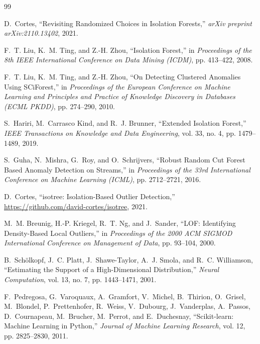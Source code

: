 
\begin{thebibliography}{99}

D.~Cortes,
``Revisiting Randomized Choices in Isolation Forests,''
\textit{arXiv preprint arXiv:2110.13402}, 2021.

F.~T. Liu, K.~M. Ting, and Z.-H. Zhou,
``Isolation Forest,''
in \textit{Proceedings of the 8th IEEE International Conference on Data Mining (ICDM)}, 
pp. 413--422, 2008.

F.~T. Liu, K.~M. Ting, and Z.-H. Zhou,
``On Detecting Clustered Anomalies Using SCiForest,''
in \textit{Proceedings of the European Conference on Machine Learning and Principles and Practice of Knowledge Discovery in Databases (ECML PKDD)},
pp. 274--290, 2010.

S.~Hariri, M.~Carrasco Kind, and R.~J. Brunner,
``Extended Isolation Forest,''
\textit{IEEE Transactions on Knowledge and Data Engineering}, 
vol. 33, no. 4, pp. 1479--1489, 2019.

S.~Guha, N.~Mishra, G.~Roy, and O.~Schrijvers,
``Robust Random Cut Forest Based Anomaly Detection on Streams,''
in \textit{Proceedings of the 33rd International Conference on Machine Learning (ICML)},
pp. 2712--2721, 2016.

D.~Cortes,
``isotree: Isolation-Based Outlier Detection,''
\url{https://github.com/david-cortes/isotree}, 2021.

M.~M. Breunig, H.-P. Kriegel, R.~T. Ng, and J.~Sander,
``LOF: Identifying Density-Based Local Outliers,''
in \textit{Proceedings of the 2000 ACM SIGMOD International Conference on Management of Data},
pp. 93--104, 2000.

B.~Sch{\"o}lkopf, J.~C. Platt, J.~Shawe-Taylor, A.~J. Smola, and R.~C. Williamson,
``Estimating the Support of a High-Dimensional Distribution,''
\textit{Neural Computation}, vol. 13, no. 7, pp. 1443--1471, 2001.

F.~Pedregosa, G.~Varoquaux, A.~Gramfort, V.~Michel, B.~Thirion, O.~Grisel, M.~Blondel, P.~Prettenhofer, R.~Weiss, V.~Dubourg, J.~Vanderplas, A.~Passos, D.~Cournapeau, M.~Brucher, M.~Perrot, and E.~Duchesnay,
``Scikit-learn: Machine Learning in Python,''
\textit{Journal of Machine Learning Research}, vol. 12, pp. 2825--2830, 2011.

\end{thebibliography}

